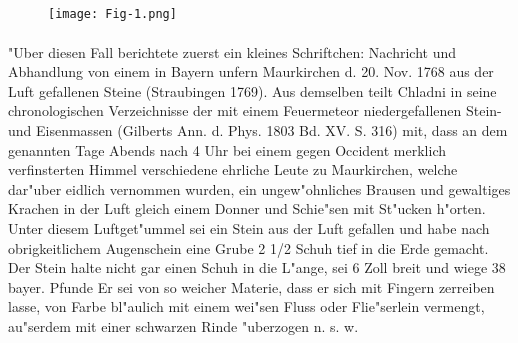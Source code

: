 \documentclass[a4paper, 11pt, oneside]{article}
\begin{document}
\subsection{}
\begin{figure}[h]
\centering
\texttt{[image: Fig-1.png]}
\caption{}
\end{figure}
\paragraph{}
"Uber diesen Fall berichtete zuerst ein kleines Schriftchen: Nachricht und Abhandlung von einem in Bayern unfern Maurkirchen d. 20. Nov. 1768 aus der Luft gefallenen Steine (Straubingen 1769). Aus demselben teilt Chladni in seine chronologischen Verzeichnisse der mit einem Feuermeteor niedergefallenen Stein- und Eisenmassen (Gilberts Ann. d. Phys. 1803 Bd. XV. S. 316) mit, dass an dem genannten Tage Abends nach 4 Uhr bei einem gegen Occident merklich verfinsterten Himmel verschiedene ehrliche Leute zu Maurkirchen, welche dar"uber eidlich vernommen wurden, ein ungew"ohnliches Brausen und gewaltiges Krachen in der Luft gleich einem Donner und Schie"sen mit St"ucken h"orten. Unter diesem Luftget"ummel sei ein Stein aus der Luft gefallen und habe nach obrigkeitlichem Augenschein eine Grube 2 1/2 Schuh tief in die Erde gemacht. Der Stein halte nicht gar einen Schuh in die L"ange, sei 6 Zoll breit und wiege 38 bayer. Pfunde Er sei von so weicher Materie, dass er sich mit Fingern zerreiben lasse, von Farbe bl"aulich mit einem wei"sen Fluss oder Flie"serlein vermengt, au"serdem mit einer schwarzen Rinde "uberzogen n. s. w.
\end{document}
